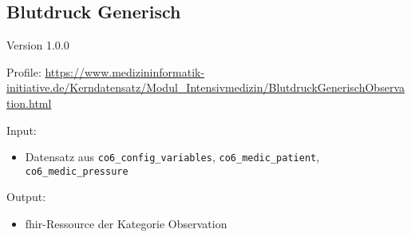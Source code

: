 \subsection{
Blutdruck Generisch} 
\noindent Version 1.0.0

\noindent Profile: \url{https://www.medizininformatik-initiative.de/Kerndatensatz/Modul_Intensivmedizin/BlutdruckGenerischObservation.html}

\noindent Input:
\begin{itemize}
	\item Datensatz aus \texttt{co6\_config\_variables}, \texttt{co6\_medic\_patient}, \\ \texttt{co6\_medic\_pressure}
\end{itemize}
Output:
\begin{itemize}
        \item \ac{fhir}-Ressource der Kategorie \glqq Observation\grqq{}
\end{itemize}
